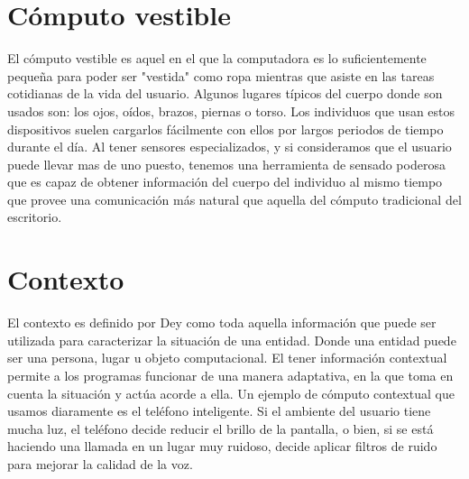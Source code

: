 \documentclass[letterpaper,12pt]{cicese}
\begin{document}
			\section{C\'omputo vestible}
				El c\'omputo vestible es aquel en el que la computadora es lo suficientemente peque\~na para poder ser "vestida" como ropa mientras que asiste en las
				tareas cotidianas de la vida del usuario\citep{Starner97augmentedreality}. Algunos lugares t\'ipicos del cuerpo donde son usados son: los ojos, o\'idos, brazos, piernas o torso.
				Los individuos que usan estos dispositivos suelen cargarlos f\'acilmente con ellos por largos periodos de tiempo durante el d\'ia. Al tener sensores
				especializados, y si consideramos que el usuario puede llevar mas de uno puesto, tenemos una herramienta de sensado poderosa que es capaz de obtener
				informaci\'on del cuerpo del individuo al mismo tiempo que provee una comunicaci\'on m\'as natural que aquella del c\'omputo tradicional del escritorio.

			\section{Contexto}
				El contexto es definido por Dey \citep{Dey2001} como toda aquella informaci\'on que puede ser utilizada para caracterizar la situaci\'on de una entidad. Donde una
				entidad puede ser una persona, lugar u objeto computacional. El tener informaci\'on contextual permite a los programas funcionar de una manera adaptativa,
				en la que toma en cuenta la situaci\'on y act\'ua acorde a ella. Un ejemplo de c\'omputo contextual que usamos diaramente es el tel\'efono inteligente.
				Si el ambiente del usuario tiene mucha luz, el tel\'efono decide reducir el brillo de la pantalla, o bien, si se est\'a haciendo una llamada en un lugar muy ruidoso,
				decide aplicar filtros de ruido para mejorar la calidad de la voz.
		
\end{document}
